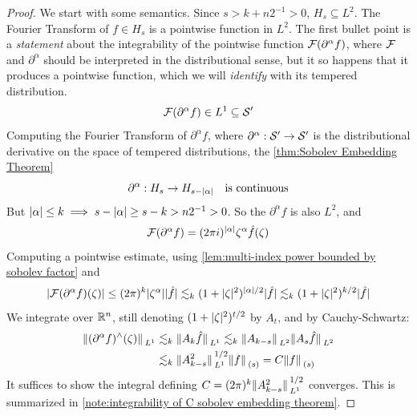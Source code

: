 \documentclass[../main-v2-manifolds.tex]{subfiles}
\begin{document}
\begin{proof}
We start with some semantics. Since $s>k+n2^{-1}>0$, $H_s\subseteq L^2$. The Fourier Transform of $f\in H_s$ is a pointwise function in $L^2$. The first bullet point is a \emph{statement} about the integrability of the pointwise function $\mathcal{F}(\partial^\alpha f)$, where $\mathcal{F}$ and $\partial^\alpha$ should be interpreted in the distributional sense, but it so happens that it produces a pointwise function, which we will \emph{identify} with its tempered distribution.
\[
\mathcal{F}(\partial^\alpha f)\in L^1\subseteq\mathcal{S}'
\]
Computing the Fourier Transform of $\partial^\alpha f$, where $\partial^\alpha: \mathcal{S}'\to\mathcal{S}'$ is the distributional derivative on the space of tempered distributions, the \cref{thm:Sobolev Embedding Theorem}
\[
\partial^\alpha: H_s\to H_{s-\vert {\alpha} \vert}\quad\text{is continuous}
\]
But $\vert {\alpha} \vert\leq k\implies s-\vert {\alpha} \vert \geq s-k > n2^{-1}>0$. So the $\partial^\alpha f$ is also $L^2$, and 
\[
\mathcal{F}(\partial^\alpha f) = (2\pi i)^{\vert {\alpha} \vert}\zeta^{\alpha}\hat{f}(\zeta)
\]
Computing a pointwise estimate, using \cref{lem:multi-index power bounded by sobolev factor} and 
\[
\vert {\mathcal{F}(\partial^\alpha f)(\zeta)} \vert\leq(2\pi)^{k}\vert {\zeta^\alpha} \vert \vert {\hat{f}} \vert\lesssim_k (1+\vert {\zeta} \vert^2)^{\vert {\alpha} \vert/2}\vert {\hat{f}} \vert
\lesssim_k (1+\vert {\zeta} \vert^2)^{k/2}\vert {\hat{f}} \vert
\]
We integrate over ${\mathbb{R}^n}$, still denoting $(1+\vert {\zeta} \vert^2)^{t/2}$ by $A_t$, and by Cauchy-Schwartz:
\begin{align*}
\norm*{(\partial^\alpha f)^{\wedge}(\zeta)}_{L^1}&\lesssim_k \norm*{A_k \hat{f}}_{L^1}\lesssim_k \norm*{A_{k-s}}_{L^2}\norm*{A_{s}\hat{f}}_{L^2}\\
&\lesssim_k \norm*{A^2_{k-s}}_{L^1}^{1/2}\norm*{f}_{(s)}= C\norm*{f}_{(s)}
\end{align*}
It suffices to show the integral defining $C= (2\pi)^k\norm*{A^2_{k-s}}_{L^1}^{1/2}$ converges. This is summarized in \cref{note:integrability of C sobolev embedding theorem}.


\end{proof}
\end{document}
